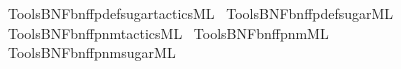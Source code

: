 \begin{isabellebody}
\isamarkupfalse%
\ {\isacartoucheopen}Tools{\isacharslash}{\kern0pt}BNF{\isacharslash}{\kern0pt}bnf{\isacharunderscore}{\kern0pt}fp{\isacharunderscore}{\kern0pt}def{\isacharunderscore}{\kern0pt}sugar{\isacharunderscore}{\kern0pt}tactics{\isachardot}{\kern0pt}ML{\isacartoucheclose}\isanewline
{}\isamarkupfalse%
\ {\isacartoucheopen}Tools{\isacharslash}{\kern0pt}BNF{\isacharslash}{\kern0pt}bnf{\isacharunderscore}{\kern0pt}fp{\isacharunderscore}{\kern0pt}def{\isacharunderscore}{\kern0pt}sugar{\isachardot}{\kern0pt}ML{\isacartoucheclose}\isanewline
{}\isamarkupfalse%
\ {\isacartoucheopen}Tools{\isacharslash}{\kern0pt}BNF{\isacharslash}{\kern0pt}bnf{\isacharunderscore}{\kern0pt}fp{\isacharunderscore}{\kern0pt}n{}m{\isacharunderscore}{\kern0pt}tactics{\isachardot}{\kern0pt}ML{\isacartoucheclose}\isanewline
{}\isamarkupfalse%
\ {\isacartoucheopen}Tools{\isacharslash}{\kern0pt}BNF{\isacharslash}{\kern0pt}bnf{\isacharunderscore}{\kern0pt}fp{\isacharunderscore}{\kern0pt}n{}m{\isachardot}{\kern0pt}ML{\isacartoucheclose}\isanewline
{}\isamarkupfalse%
\ {\isacartoucheopen}Tools{\isacharslash}{\kern0pt}BNF{\isacharslash}{\kern0pt}bnf{\isacharunderscore}{\kern0pt}fp{\isacharunderscore}{\kern0pt}n{}m{\isacharunderscore}{\kern0pt}sugar{\isachardot}{\kern0pt}ML{\isacartoucheclose}%
\endisatagML
{\isafoldML}%
%
\isadelimML
\isanewline
%
\endisadelimML
%
\isadelimtheory
\isanewline
%
\endisadelimtheory
%
\isatagtheory
{}\isamarkupfalse%
%
\endisatagtheory
{\isafoldtheory}%
%
\isadelimtheory
%
\endisadelimtheory
%
\end{isabellebody}%
\endinput
